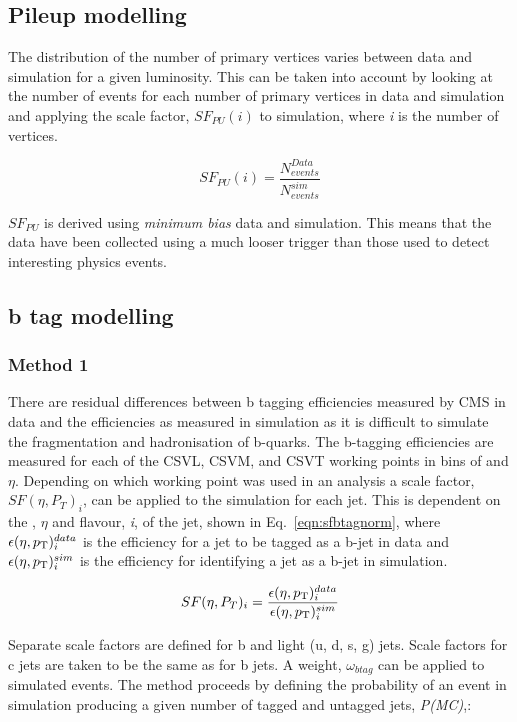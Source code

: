 \subsection{Pileup modelling}
\label{sec:pile-up}
The distribution of the number of primary vertices varies between data and simulation for a given luminosity. This can be taken into account by looking at the number of events for each number of primary vertices in data and simulation and applying the scale factor, $SF_{PU}\left( i \right)$ to simulation, where \emph{i} is the number of vertices.

\begin{equation}
SF_{PU}\left( i \right) = \frac{N_{events}^{Data}}{  N_{events}^{sim}} 
\label{eqn:PUSF}
\end{equation}

$SF_{PU}$ is derived using \emph{minimum bias} data and simulation. This means that the data have been collected using a much looser trigger than those used to detect interesting physics events. 

\subsection{b tag modelling ~\label{sec:btagModelling}}

\subsubsection{Method 1 ~\label{subsec:method1btag}}
There are residual differences between b tagging efficiencies measured by CMS in data and the efficiencies as measured in simulation as it is difficult to simulate the fragmentation and hadronisation of b-quarks. 
The b-tagging efficiencies are measured for each of the CSVL, CSVM, and CSVT working points in bins of \pt and $\eta$. Depending on which working point was used in an analysis a scale factor, $SF(\eta, P_{T})_{i}$,  can be applied to the simulation for each jet. This is dependent on the \pt, $\eta$ and flavour, \emph{i}, of the jet, shown in Eq.~\ref{eqn:sfbtagnorm}, where $\epsilon(\eta , p_{\mathrm{T}})^{data}_{i}$ is the efficiency for a jet to be tagged as a b-jet in data and $\epsilon(\eta , p_{\mathrm{T}})^{sim}_{i}$ is the efficiency for identifying a jet as a b-jet in simulation.

\begin{centering}
\begin{equation}
SF(\eta, P_{T})_{i} = \frac{\epsilon(\eta , p_{\mathrm{T}})^{data}_{i}}{\epsilon(\eta , p_{\mathrm{T}})^{sim}_{i}}
\label{eqn:sfbtagnorm}
\end{equation}
\end{centering}
Separate scale factors are defined for b and light (u, d, s, g) jets. Scale factors for c jets are taken to be the same as for b jets. A weight, $\omega_{btag}$ can be applied to simulated events. The method proceeds by defining the probability of an event in simulation producing a given number of tagged and untagged jets, \emph{P(MC)},:

